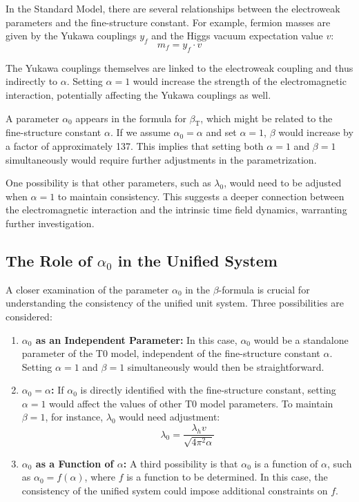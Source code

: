 \documentclass[12pt,a4paper]{article}
\newcommand{\betaT}{\beta_{\text{T}}}
\begin{document}
	In the Standard Model, there are several relationships between the electroweak parameters and the fine-structure constant. For example, fermion masses are given by the Yukawa couplings \(y_f\) and the Higgs vacuum expectation value \(v\):
	\begin{equation}
		m_f = y_f \cdot v
	\end{equation}
	
	The Yukawa couplings themselves are linked to the electroweak coupling and thus indirectly to \(\alpha\). Setting \(\alpha = 1\) would increase the strength of the electromagnetic interaction, potentially affecting the Yukawa couplings as well.
	
	A parameter \(\alpha_0\) appears in the formula for \(\betaT\), which might be related to the fine-structure constant \(\alpha\). If we assume \(\alpha_0 = \alpha\) and set \(\alpha = 1\), \(\beta\) would increase by a factor of approximately 137. This implies that setting both \(\alpha = 1\) and \(\beta = 1\) simultaneously would require further adjustments in the parametrization.
	
	One possibility is that other parameters, such as \(\lambda_0\), would need to be adjusted when \(\alpha = 1\) to maintain consistency. This suggests a deeper connection between the electromagnetic interaction and the intrinsic time field dynamics, warranting further investigation.
	
	\subsection{The Role of \(\alpha_0\) in the Unified System}
	
	A closer examination of the parameter \(\alpha_0\) in the \(\beta\)-formula is crucial for understanding the consistency of the unified unit system. Three possibilities are considered:
	
	\begin{enumerate}
		\item \textbf{\(\alpha_0\) as an Independent Parameter:} In this case, \(\alpha_0\) would be a standalone parameter of the T0 model, independent of the fine-structure constant \(\alpha\). Setting \(\alpha = 1\) and \(\beta = 1\) simultaneously would then be straightforward.
		
		\item \textbf{\(\alpha_0 = \alpha\):} If \(\alpha_0\) is directly identified with the fine-structure constant, setting \(\alpha = 1\) would affect the values of other T0 model parameters. To maintain \(\beta = 1\), for instance, \(\lambda_0\) would need adjustment:
		\begin{equation}
			\lambda_0 = \frac{\lambda_h v}{\sqrt{4\pi^2 \alpha}}
		\end{equation}
		
		\item \textbf{\(\alpha_0\) as a Function of \(\alpha\):} A third possibility is that \(\alpha_0\) is a function of \(\alpha\), such as \(\alpha_0 = f(\alpha)\), where \(f\) is a function to be determined. In this case, the consistency of the unified system could impose additional constraints on \(f\).
	\end{enumerate}
	
\end{document}

